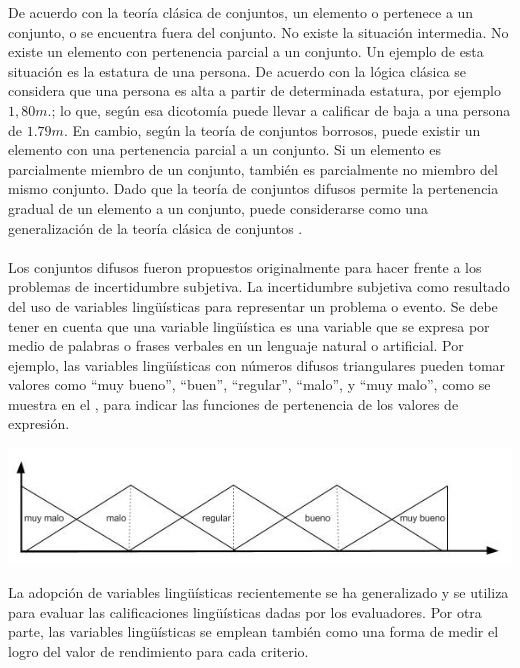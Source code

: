 De acuerdo con la teoría clásica de conjuntos, un elemento o pertenece a un conjunto, o se encuentra fuera del conjunto. No existe la situación intermedia. No existe un elemento con pertenencia parcial a un conjunto. Un ejemplo de esta situación es la estatura de una persona. De acuerdo con la lógica clásica se considera que una persona es alta a partir de determinada estatura, por ejemplo $1,80 m.$; lo que, según esa dicotomía puede llevar a calificar de baja a una persona de $1.79 m.$ En cambio, según la teoría de conjuntos borrosos, puede existir un elemento con una pertenencia parcial a un conjunto. Si un elemento es parcialmente miembro de un conjunto, también es parcialmente no miembro del mismo conjunto. Dado que la teoría de conjuntos difusos permite la pertenencia gradual de un elemento a un conjunto, puede considerarse como una generalización de la teoría clásica de conjuntos \cite[]{negnevitsky2005artificial, zadeh2008there}.\\
\\
Los conjuntos difusos fueron propuestos originalmente para hacer frente a los problemas de incertidumbre subjetiva. La incertidumbre subjetiva como resultado del uso de variables lingüísticas para representar un problema o  evento. Se debe tener en cuenta que una variable lingüística es una variable que se expresa por medio de palabras o frases verbales en un lenguaje natural o artificial. Por ejemplo, las variables lingüísticas con números difusos triangulares pueden tomar valores como ``muy bueno'', ``buen'', ``regular'', ``malo'', y ``muy malo'', como se muestra en el , para indicar las funciones de pertenencia de los valores de expresión.
\begin{grafico}[titulo = Función de pertenencia de algunas variables lingüísticas, etiqueta=graficoVariables]
\includegraphics[width=15cm]{graficas/variables.jpg}
\end{grafico}
La adopción de variables lingüísticas recientemente se ha generalizado y se utiliza para evaluar las calificaciones lingüísticas dadas por los evaluadores. Por otra parte, las variables lingüísticas se emplean también como una forma de medir el logro del valor de rendimiento para cada criterio.\\
